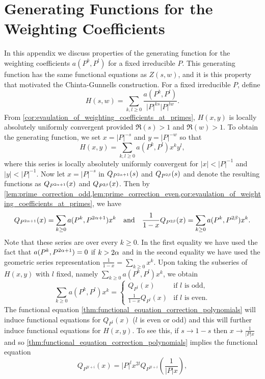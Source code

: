 \documentclass[12pt,reqno,oneside]{amsart}
\begin{document}
\appendix
\section*{Generating Functions for the Weighting Coefficients}
    In this appendix we discuss properties of the generating function for the weighting coefficients $a(P^{k},P^{l})$ for a fixed irreducible $P$. This generating function has the same functional equations as $Z(s,w)$, and it is this property that motivated the Chinta-Gunnells construction. For a fixed irreducible $P$, define
    \[
        H(s,w) = \sum_{k,l \ge 0}\frac{a(P^{k},P^{l})}{|P|^{ks}|P|^{lw}}.
    \]
    From \cref{cor:evaulation_of_weighting_coefficients_at_primes}, $H(x,y)$ is locally absolutely uniformly convergent provided $\Re(s) > 1$ and $\Re(w) > 1$. To obtain the generating function, we set $x = |P|^{-s}$ and $y = |P|^{-w}$ so that
    \[
        H(x,y) = \sum_{k,l \ge 0}a(P^{k},P^{l})x^{k}y^{l},
    \]
    where this series is locally absolutely uniformly convergent for $|x| < |P|^{-1}$ and $|y| < |P|^{-1}$. Now let $x = |P|^{-s}$ in $Q_{P^{2\alpha+1}}(s)$ and $Q_{P^{2\beta}}(s)$ and denote the resulting functions as $Q_{P^{2\alpha+1}}(x)$ and $Q_{P^{2\beta}}(x)$. Then by \cref{lem:prime_correction_odd,lem:prime_correction_even,cor:evaulation_of_weighting_coefficients_at_primes}, we have
    \[
        Q_{P^{2\alpha+1}}(x) = \sum_{k \ge 0}a(P^{k},P^{2\alpha+1})x^{k} \quad \text{and} \quad \frac{1}{1-x}Q_{P^{2\beta}}(x) = \sum_{k \ge 0}a(P^{k},P^{2\beta})x^{k}.
    \]
    Note that these series are over every $k \ge 0$. In the first equality we have used the fact that $a(P^{k},P^{2\alpha+1}) = 0$ if $k > 2\alpha$ and in the second equality we have used the geometric series representation $\frac{1}{1-x} = \sum_{k \ge 0}x^{k}$. Upon taking the subseries of $H(x,y)$ with $l$ fixed, namely $\sum_{k \ge 0}a(P^{k},P^{l})x^{k}$, we obtain
    \[
        \sum_{k \ge 0}a(P^{k},P^{l})x^{k} = \begin{cases} Q_{P^{l}}(x) & \text{if $l$ is odd}, \\ \frac{1}{1-x}Q_{P^{l}}(x) & \text{if $l$ is even}. \end{cases}
    \]
    The functional equation \cref{thm:functional_equation_correction_polynomials} will induce functional equations for $Q_{P^{l}}(x)$ ($l$ is even or odd) and this will further induce functional equations for $H(x,y)$. To see this, if $s \to 1-s$ then $x \to \frac{1}{|P|x}$ and so \cref{thm:functional_equation_correction_polynomials} implies the functional equation
    \[
        Q_{P^{2l+i}}(x) = |P|^{l}x^{2l}Q_{P^{2l+i}}\left(\frac{1}{|P|x}\right),
    \]
\end{document}
